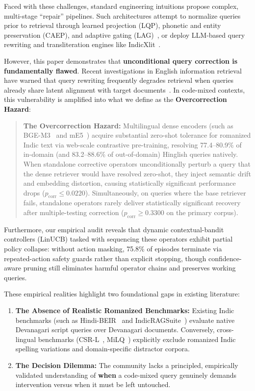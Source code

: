 \documentclass[conference]{IEEEtran}
\begin{document}
Faced with these challenges, standard engineering intuitions propose complex, multi-stage ``repair'' pipelines. Such architectures attempt to normalize queries prior to retrieval through learned projection (LQP), phonetic and entity preservation (CAEP), and adaptive gating (LAG)~\cite{gupta2014query}, or deploy LLM-based query rewriting and transliteration engines like IndicXlit~\cite{madhani2023aksharantar}.

However, this paper demonstrates that \textbf{unconditional query correction is fundamentally flawed}. Recent investigations in English information retrieval have warned that query rewriting frequently degrades retrieval when queries already share latent alignment with target documents~\cite{kotte2026not}. In code-mixed contexts, this vulnerability is amplified into what we define as the \textbf{Overcorrection Hazard}:
\begin{quote}
\textbf{The Overcorrection Hazard:} Multilingual dense encoders (such as BGE-M3~\cite{chen2024bge} and mE5~\cite{wang2024multilingual}) acquire substantial zero-shot tolerance for romanized Indic text via web-scale contrastive pre-training, resolving 77.4--80.9\% of in-domain (and 83.2--88.6\% of out-of-domain) Hinglish queries natively. When standalone corrective operators unconditionally perturb a query that the dense retriever would have resolved zero-shot, they inject semantic drift and embedding distortion, causing statistically significant performance drops ($p_{\text{corr}} \le 0.0220$). Simultaneously, on queries where the base retriever fails, standalone operators rarely deliver statistically significant recovery after multiple-testing correction ($p_{\text{corr}} \ge 0.3300$ on the primary corpus).
\end{quote}

Furthermore, our empirical audit reveals that dynamic contextual-bandit controllers (LinUCB) tasked with sequencing these operators exhibit partial policy collapse: without action masking, 75.8\% of episodes terminate via repeated-action safety guards rather than explicit stopping, though confidence-aware pruning still eliminates harmful operator chains and preserves working queries.

These empirical realities highlight two foundational gaps in existing literature:
\begin{enumerate}
    \item \textbf{The Absence of Realistic Romanized Benchmarks:} Existing Indic benchmarks (such as Hindi-BEIR~\cite{acharya2024hindibeir} and IndicRAGSuite~\cite{prasanjith2025indicragsuite}) evaluate native Devanagari script queries over Devanagari documents. Conversely, cross-lingual benchmarks (CSR-L~\cite{zeng2026code}, MiLQ~\cite{kim2025milq}) explicitly exclude romanized Indic spelling variations and domain-specific distractor corpora.
    \item \textbf{The Decision Dilemma:} The community lacks a principled, empirically validated understanding of \textbf{when} a code-mixed query genuinely demands intervention versus when it must be left untouched.
\end{enumerate}
\end{document}
